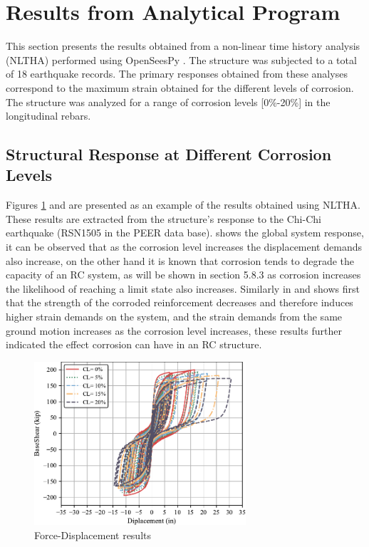 \section{Results from Analytical Program}
This section presents the results obtained from a non-linear time history analysis (NLTHA) performed using OpenSeesPy \cite{Zhu2018}. The structure was subjected to a total of 18 earthquake records. The primary responses obtained from these analyses correspond to the maximum strain obtained for the different levels of corrosion. The structure was analyzed for a range of corrosion levels [0\%-20\%] in the longitudinal rebars.

\subsection{Structural Response at Different Corrosion Levels}
Figures \ref{fig:Force-Displacement_Results} and  are presented as an example of the results obtained using NLTHA. These results are extracted from the structure's response to the Chi-Chi earthquake (RSN1505 in the PEER data base).  shows the global system response, it can be observed that as the corrosion level increases the displacement demands also increase, on the other hand it is known that corrosion tends to degrade the capacity of an RC system, as will be shown in section 5.8.3 as corrosion increases the likelihood of reaching a limit state also increases. Similarly in  and  shows first that the strength of the corroded reinforcement decreases and therefore induces higher strain demands on the system, and the strain demands from the same ground motion increases as the corrosion level increases, these results further indicated the effect corrosion can have in an RC structure.

\begin{figure}[htbp]
	\centering
	\includegraphics[width=0.7\textwidth]{Chapter-5/figs/Force_Diplacement_RSN1505.pdf}
	\caption{Force-Displacement results}
	\label{fig:Force-Displacement_Results}
\end{figure}

